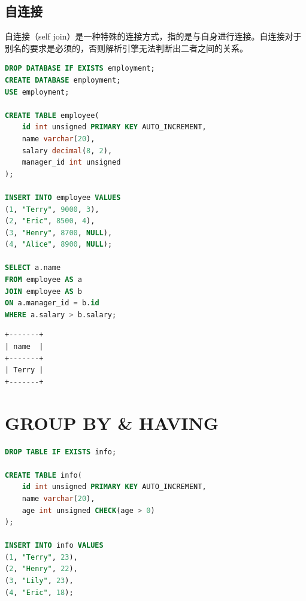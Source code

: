 \documentclass[12pt, openany, oneside]{book}
\begin{document}
\vspace{0.5cm}

\section{自连接}

自连接（self join）是一种特殊的连接方式，指的是与自身进行连接。自连接对于别名的要求是必须的，否则解析引擎无法判断出二者之间的关系。\\


\begin{lstlisting}[language=SQL]
DROP DATABASE IF EXISTS employment;
CREATE DATABASE employment;
USE employment;

CREATE TABLE employee(
    id int unsigned PRIMARY KEY AUTO_INCREMENT,
    name varchar(20),
    salary decimal(8, 2),
    manager_id int unsigned
);

INSERT INTO employee VALUES
(1, "Terry", 9000, 3),
(2, "Eric", 8500, 4),
(3, "Henry", 8700, NULL),
(4, "Alice", 8900, NULL);

SELECT a.name
FROM employee AS a
JOIN employee AS b
ON a.manager_id = b.id
WHERE a.salary > b.salary;
\end{lstlisting}

\begin{tcolorbox}
	\begin{verbatim}
+-------+
| name  |
+-------+
| Terry |
+-------+
	\end{verbatim}
\end{tcolorbox}

\newpage

\chapter{GROUP BY \& HAVING}

\vspace{0.5cm}


\begin{lstlisting}[language=SQL]
DROP TABLE IF EXISTS info;

CREATE TABLE info(
    id int unsigned PRIMARY KEY AUTO_INCREMENT,
    name varchar(20),
    age int unsigned CHECK(age > 0)
);

INSERT INTO info VALUES
(1, "Terry", 23),
(2, "Henry", 22),
(3, "Lily", 23),
(4, "Eric", 18);
\end{lstlisting}
\end{document}
